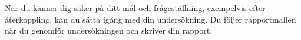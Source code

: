 \documentclass[a4paper]{miunasgn}
\begin{document}
När du känner dig säker på ditt mål och frågeställning, exempelvis efter 
återkoppling, kan du sätta igång med din undersökning.
Du följer rapportmallen när du genomför undersökningen och skriver din rapport.

\begin{comment}
\subsection{Inspiration för projektidéer}
\noindent
The topic should be comparative analyses of (minimum two) different 
technologies.  Here are four possible alternatives: 

Compare two data communication standards. Explain their basic principles with 
your own words, and draw your own conclusions about their advantages and 
disadvantages, as well as which of them are expected to be improved in couple 
of years. http://wikipedia.org , and the course book can be used as resources.  
If there are RFCs for these standards (Request for Comments – which exist for 
the standards at the network and higher layers), read them. RFC are normally 
easy to read. The standards on physical layer or data‐link layer, for example 
IEEE standards are often RFCs, but that would be more difficult to understand 
than for example the transport protocols UDP and TCP or the e‐mail protocols 
POP3 and IMAP4.  You can even compare two xDSL – modem standards (for example 
ADSL2+ and VDSL2), or different wireless communication schemes (for example 
IEEE802.11a versus b, different security schemes for wireless LAN, Bluetooth 
versus IRDA, etc.). Here you will probably find the most difficult to read the 
documents about the standard. Describe their advantages and disadvantages.  
Draw your own conclusions about when the respective protocol is most convenient 
to be used and what is expected to be largely used in the coming years. 

Test and compare two types of software in the area of data communication.  
Install and test two comparable software packages, for example two firewalls, 
two instant message‐programs, two IP telephony programs, etc. You can use 
a freeware, shareware or demo versions of commercial packages. One site that 
offers downloads www.download.com. Once you decide what you are going to 
compare, try to find out the protocols and other paradigms used in each of 
them. Evaluate their usability, functionality and performance, for example in 
a specific usage scenario or for specific user group. Criticize the marketing 
motivations for the developers. Compile your thoughts about both programs 
‐ advantages, disadvantages and performance‐ into a table or a bulleted list, 
and draw conclusions about which of the programs is the best taking into 
account all the properties, or according to your own beliefs will dominate the 
market in the coming years.


\end{comment}
\end{document}
